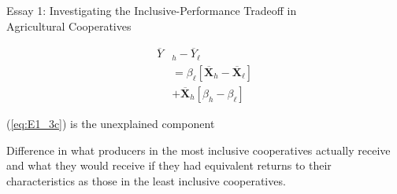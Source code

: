 \documentclass[aspectratio=169]{beamer}
\newenvironment{wideitemize}{\itemize\addtolength{\itemsep}{10pt}}{\enditemize}
\begin{document}
\begin{frame}{Essay 1: Investigating the Inclusive-Performance Tradeoff in \\ \hspace{1.7cm} Agricultural Cooperatives}
        \addtocounter{equation}{-1}
        \begin{subequations}
            \begin{align}
                \overline{Y}&_{h} - \overline{Y}_{\ell} \label{eq:E1_3a} \\
                &= \beta_{\ell}[\overline{\mathbf{X}}_{h} - \overline{\mathbf{X}}_{\ell}] \label{eq:E1_3b} \\
                &+ \overline{\mathbf{X}}_{h}[\beta_{h} - \beta_{\ell}] \label{eq:E1_3c}
            \end{align}
        \end{subequations}  
    \begin{wideitemize}
        \item (\ref{eq:E1_3c}) is the unexplained component \vspace{.25cm}
             \begin{wideitemize}
                \item Difference in what producers in the most inclusive cooperatives actually receive and what they would receive if they had equivalent returns to their characteristics as those in the least inclusive cooperatives.
            \end{wideitemize}
    \end{wideitemize}    
\end{frame}
\end{document}
